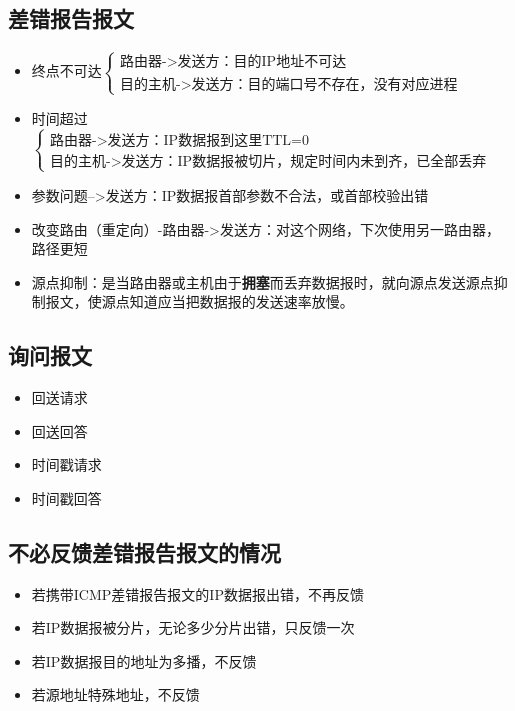 \subsection{差错报告报文}
\begin{itemize}
    \item 终点不可达\(\begin{cases}
        \text{路由器->发送方：目的IP地址不可达} \\ 
        \text{目的主机->发送方：目的端口号不存在，没有对应进程}
    \end{cases}\)
    \item 时间超过\(\begin{cases}
        \text{路由器->发送方：IP数据报到这里TTL=0} \\ 
        \text{目的主机->发送方：IP数据报被切片，规定时间内未到齐，已全部丢弃}
    \end{cases}\)
    \item 参数问题-->发送方：IP数据报首部参数不合法，或首部校验出错
    \item 改变路由（重定向）-路由器->发送方：对这个网络，下次使用另一路由器，路径更短
    \item 源点抑制：是当路由器或主机由于\textbf{拥塞}而丢弃数据报时，就向源点发送源点抑制报文，使源点知道应当把数据报的发送速率放慢。
\end{itemize}


\subsection{询问报文}
\begin{itemize}
    \item 回送请求
    \item 回送回答
    \item 时间戳请求
    \item 时间戳回答
\end{itemize}


\subsection{不必反馈差错报告报文的情况}
\begin{itemize}
    \item 若携带ICMP差错报告报文的IP数据报出错，不再反馈
    \item 若IP数据报被分片，无论多少分片出错，只反馈一次
    \item 若IP数据报目的地址为多播，不反馈
    \item 若源地址特殊地址，不反馈
\end{itemize}


